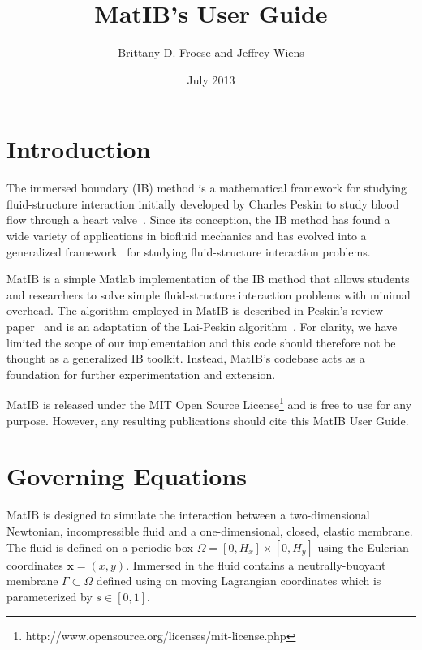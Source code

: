 \documentclass{article}
\title{MatIB's User Guide}
\author{Brittany D. Froese and Jeffrey Wiens}
\date{July 2013}
\newcommand{\bs}[1]{\boldsymbol{#1}}
\begin{document}
\maketitle

\section{Introduction}\label{sec:intro}

The immersed boundary (IB) method is a mathematical framework for studying fluid-structure interaction  
initially developed by Charles Peskin to study blood flow through a heart valve~\cite{PeskinHearts}. 
Since its conception, the IB method has found a wide variety of applications in biofluid mechanics and has
evolved into a generalized framework~\cite{PeskinIB} for studying fluid-structure interaction problems. 

MatIB is a simple Matlab implementation of the IB method that allows students and researchers to 
solve simple fluid-structure interaction problems with minimal overhead. 
The algorithm employed in MatIB is described in Peskin's review paper~\cite{PeskinIB} 
and is an adaptation of the Lai-Peskin algorithm~\cite{LaiAlgorithm}. For clarity, we have limited 
the scope of our implementation and this code should therefore not be thought as a generalized IB toolkit. 
Instead, MatIB's codebase acts as a foundation for further experimentation and extension.

MatIB is released under the 
MIT Open Source License\footnote{http://www.opensource.org/licenses/mit-license.php} and is free to use 
for any purpose. However, any resulting publications should cite this
MatIB User Guide.


\section{Governing Equations}\label{sec:equations}

MatIB is designed to simulate the interaction between a two-dimensional Newtonian, incompressible fluid 
and a one-dimensional, closed, elastic membrane. The fluid is defined on a periodic box $\Omega = [0,H_x] \times [0,H_y]$
using the Eulerian coordinates $\bs{x} = (x,y)$. Immersed in the fluid contains a neutrally-buoyant membrane $\Gamma \subset \Omega$
defined using on moving Lagrangian coordinates which is parameterized by $s \in [0,1]$.
\end{document}
